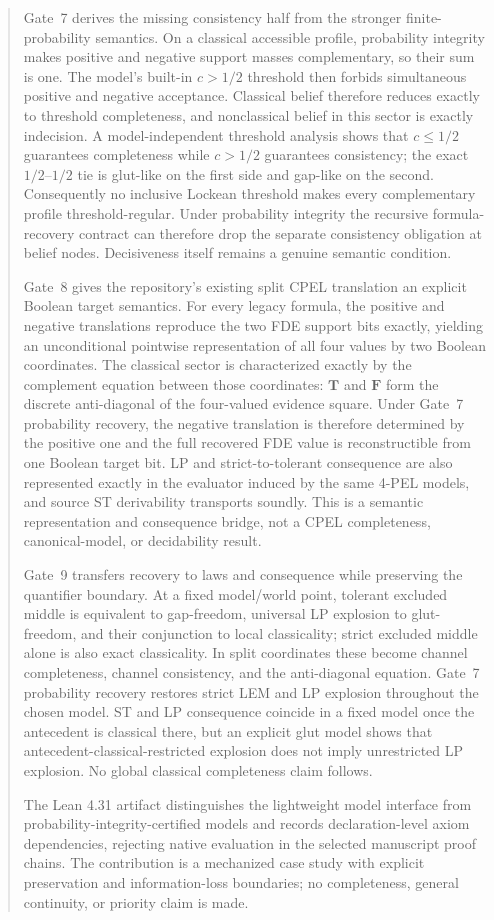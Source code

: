 \documentclass[11pt,a4paper]{article}
\theoremstyle{definition}
\newcommand{\Tval}{\mathbf{T}}
\newcommand{\Fval}{\mathbf{F}}
\begin{document}
\begin{abstract}
Gate~7 derives the missing consistency half from the stronger finite-probability semantics. On a classical accessible profile, probability integrity makes positive and negative support masses complementary, so their sum is one. The model's built-in \(c>1/2\) threshold then forbids simultaneous positive and negative acceptance. Classical belief therefore reduces exactly to threshold completeness, and nonclassical belief in this sector is exactly indecision. A model-independent threshold analysis shows that \(c\le 1/2\) guarantees completeness while \(c>1/2\) guarantees consistency; the exact \(1/2\)--\(1/2\) tie is glut-like on the first side and gap-like on the second. Consequently no inclusive Lockean threshold makes every complementary profile threshold-regular. Under probability integrity the recursive formula-recovery contract can therefore drop the separate consistency obligation at belief nodes. Decisiveness itself remains a genuine semantic condition.

Gate~8 gives the repository's existing split CPEL translation an explicit Boolean target semantics. For every legacy formula, the positive and negative translations reproduce the two FDE support bits exactly, yielding an unconditional pointwise representation of all four values by two Boolean coordinates. The classical sector is characterized exactly by the complement equation between those coordinates: \(\Tval\) and \(\Fval\) form the discrete anti-diagonal of the four-valued evidence square. Under Gate~7 probability recovery, the negative translation is therefore determined by the positive one and the full recovered FDE value is reconstructible from one Boolean target bit. LP and strict-to-tolerant consequence are also represented exactly in the evaluator induced by the same 4-PEL models, and source ST derivability transports soundly. This is a semantic representation and consequence bridge, not a CPEL completeness, canonical-model, or decidability result.

Gate~9 transfers recovery to laws and consequence while preserving the quantifier boundary. At a fixed model/world point, tolerant excluded middle is equivalent to gap-freedom, universal LP explosion to glut-freedom, and their conjunction to local classicality; strict excluded middle alone is also exact classicality. In split coordinates these become channel completeness, channel consistency, and the anti-diagonal equation. Gate~7 probability recovery restores strict LEM and LP explosion throughout the chosen model. ST and LP consequence coincide in a fixed model once the antecedent is classical there, but an explicit glut model shows that antecedent-classical-restricted explosion does not imply unrestricted LP explosion. No global classical completeness claim follows.

The Lean 4.31 artifact distinguishes the lightweight model interface from probability-integrity-certified models and records declaration-level axiom dependencies, rejecting native evaluation in the selected manuscript proof chains. The contribution is a mechanized case study with explicit preservation and information-loss boundaries; no completeness, general continuity, or priority claim is made.
\end{abstract}
\end{document}
